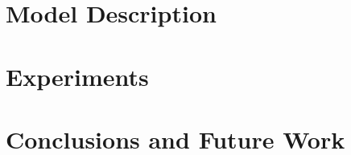 \documentclass[10pt,twocolumn,letterpaper]{article}
\newcommand{\+}[1]{\ensuremath{{\boldsymbol #1}}}
\begin{document}
\section{Model Description} \label{sec:model} 
%
%
\section{Experiments} \label{sec:experiments} 
%
%
\section{Conclusions and Future Work} \label{sec:conclusions} 

{\small

  
}
\end{document}
